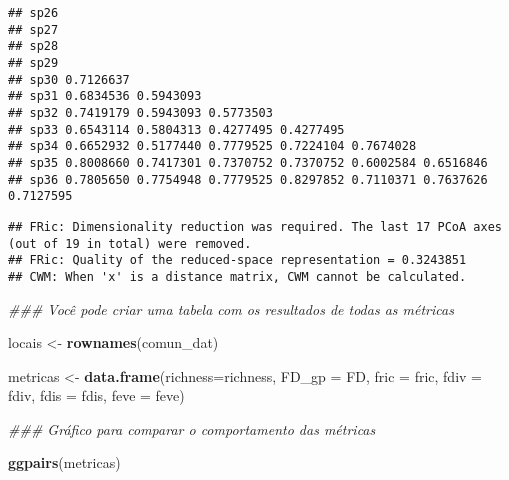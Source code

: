 \documentclass[
]{book}
\newenvironment{Shaded}{\begin{snugshade}}{\end{snugshade}}
\newcommand{\CommentTok}[1]{\textcolor[rgb]{0.56,0.35,0.01}{\textit{#1}}}
\newcommand{\DataTypeTok}[1]{\textcolor[rgb]{0.13,0.29,0.53}{#1}}
\newcommand{\KeywordTok}[1]{\textcolor[rgb]{0.13,0.29,0.53}{\textbf{#1}}}
\newcommand{\NormalTok}[1]{#1}
\newcommand{\OperatorTok}[1]{\textcolor[rgb]{0.81,0.36,0.00}{\textbf{#1}}}
\newcommand{\StringTok}[1]{\textcolor[rgb]{0.31,0.60,0.02}{#1}}
\begin{document}
\begin{verbatim}
## sp26                                                                      
## sp27                                                                      
## sp28                                                                      
## sp29                                                                      
## sp30 0.7126637                                                            
## sp31 0.6834536 0.5943093                                                  
## sp32 0.7419179 0.5943093 0.5773503                                        
## sp33 0.6543114 0.5804313 0.4277495 0.4277495                              
## sp34 0.6652932 0.5177440 0.7779525 0.7224104 0.7674028                    
## sp35 0.8008660 0.7417301 0.7370752 0.7370752 0.6002584 0.6516846          
## sp36 0.7805650 0.7754948 0.7779525 0.8297852 0.7110371 0.7637626 0.7127595
\end{verbatim}

\begin{Shaded}
\end{Shaded}

\begin{verbatim}
## FRic: Dimensionality reduction was required. The last 17 PCoA axes (out of 19 in total) were removed. 
## FRic: Quality of the reduced-space representation = 0.3243851 
## CWM: When 'x' is a distance matrix, CWM cannot be calculated.
\end{verbatim}

\begin{Shaded}
\begin{Highlighting}[]
\CommentTok{### Você pode criar uma tabela com os resultados de todas as métricas}

\NormalTok{locais <-}\StringTok{ }\KeywordTok{rownames}\NormalTok{(comun_dat)}

\NormalTok{metricas <-}\StringTok{ }\KeywordTok{data.frame}\NormalTok{(}\DataTypeTok{richness=}\NormalTok{richness,}
                       \DataTypeTok{FD_gp =}\NormalTok{ FD,}
                       \DataTypeTok{fric =}\NormalTok{ fric,}
                       \DataTypeTok{fdiv =}\NormalTok{ fdiv,}
                       \DataTypeTok{fdis =}\NormalTok{ fdis,}
                       \DataTypeTok{feve =}\NormalTok{ feve)}

\CommentTok{### Gráfico para comparar o comportamento das métricas}

\KeywordTok{ggpairs}\NormalTok{(metricas)}
\end{Highlighting}
\end{Shaded}
\end{document}
